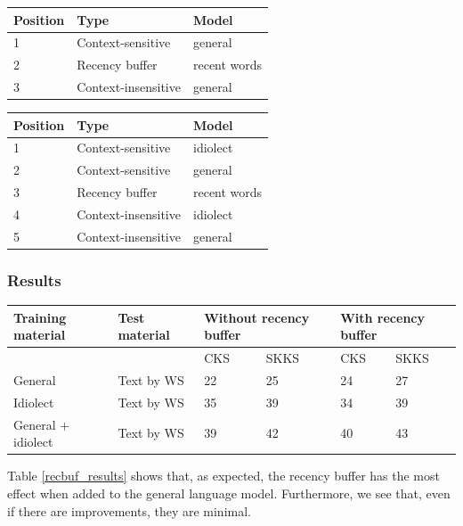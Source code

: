\documentclass[12pt]{article}
\let\originaltable\table
\let\endoriginaltable\endtable
\renewenvironment{table}[1][ht]{%
  \originaltable[#1]
  \centering}%
  {\endoriginaltable}
\begin{document}
\begin{table}[H]
\begin{tabular}{lll} 
Position&Type&Model\\
\hline
1&Context-sensitive&general\\
2&Recency buffer&recent words\\
3&Context-insensitive&general\\
\end{tabular} 
\caption{The module order for simulation 2, with the general model and the recency buffer} 
\end{table}

\begin{table}[H]
\begin{tabular}{lll} 
Position&Type&Model\\
\hline
1&Context-sensitive&idiolect\\
2&Context-sensitive&general\\
3&Recency buffer&recent words\\
4&Context-insensitive&idiolect\\
5&Context-insensitive&general\\
\end{tabular} 
\caption{The module order for simulation 3, with the idiolect model, the general model and the recency buffer} \label{sim3}
\end{table}


\subsubsection{Results} 

\begin{table}[H] 
\centering
\begin{tabular}{ll|llll} 
Training material&Test material&\multicolumn{2}{l}{Without recency buffer}&\multicolumn{2}{l}{With recency buffer}\\
\hline
&&CKS&SKKS&CKS&SKKS\\
General&Text by WS&22&25&24&27\\
Idiolect&Text by WS&35&39&34&39\\
General + idiolect&Text by WS&39&42&40&43\\
\end{tabular} 
\caption{Percentage of keystrokes that can be saved with and without the recency buffer} \label{recbuf_results}
\end{table}

Table \ref{recbuf_results} shows that, as expected, the recency buffer has the most effect when added to the general language model. Furthermore, we see that, even if there are improvements, they are minimal.
\end{document}
